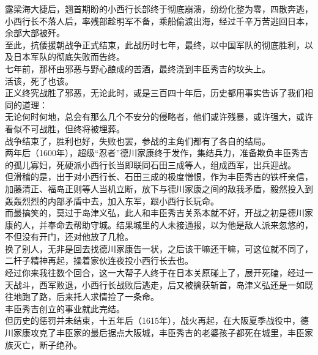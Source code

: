 \begin{multicols}{\theparacolNo}
露梁海大捷后，翘首期盼的小西行长部终于彻底崩溃，纷纷化整为零，四散奔逃，小西行长不落人后，率残部趁明军不备，乘船偷渡出海，经过千辛万苦逃回日本，余部大部被歼。\\

至此，抗倭援朝战争正式结束，此战历时七年，最终，以中国军队的彻底胜利，以及日本军队的彻底失败而告终。\\

七年前，那杯由邪恶与野心酿成的苦酒，最终浇到丰臣秀吉的坟头上。\\

活该，死了也该。\\

正义终究战胜了邪恶，无论此时，或是三百四十年后，历史都用事实告诉了我们相同的道理：\\

无论何时何地，总会有那么几个不安分的侵略者，他们或许残暴，或许强大，或许看似不可战胜，但终将被埋葬。\\

战争结束了，胜利也好，失败也罢，参战的主角们都有了各自的结局。\\

两年后（1600年），超级“忍者”德川家康终于发作，集结兵力，准备欺负丰臣秀吉的孤儿寡妇，死硬派小西行长当即联同石田三成等人，组成西军，出兵迎战。\\

但滑稽的是，出于对小西行长、石田三成的极度憎恨，作为丰臣秀吉的铁杆亲信，加藤清正、福岛正则等人当机立断，放下与德川家康之间的敌我矛盾，毅然投入到轰轰烈烈的内部矛盾中去，加入东军，跟小西行长玩命。\\

而最搞笑的，莫过于岛津义弘，此人和丰臣秀吉关系本就不好，开战之初是德川家康的人，并奉命去帮助守城。结果城里的人未接通报，以为他是敌人派来忽悠的，不但没有开门，还对他放了几枪。\\

换了别人，无非是回去找德川家康告一状，之后该干嘛还干嘛，可这位就不同了，二杆子精神再起，操着家伙连夜投小西行长去也。\\

经过你来我往数个回合，这一大帮子人终于在日本关原碰上了，展开死磕，经过一天战斗，西军败退，小西行长战败后逃走，后又被擒获斩首，岛津义弘还是一如既往地跑了路，后来托人求情捡了一条命。\\

丰臣秀吉创立的事业就此完结。\\

但历史的惩罚并未结束，十五年后（1615年），战火再起，在大阪夏季战役中，德川家康攻克了丰臣家的最后据点大阪城，丰臣秀吉的老婆孩子都死在城里，丰臣家族灭亡，断子绝孙。\\


\end{multicols}
